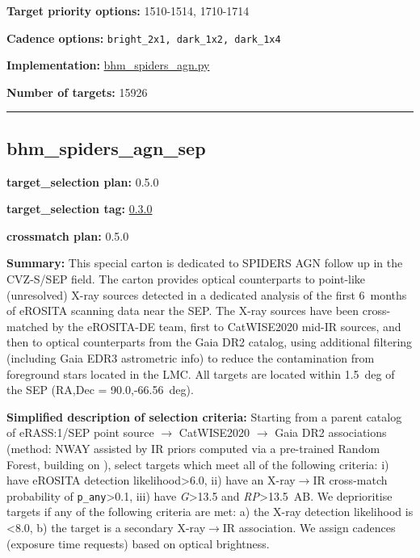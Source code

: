 \noindent\textbf{Target priority options:} 1510-1514, 1710-1714

\noindent\textbf{Cadence options:} \texttt{bright\_2x1,\ dark\_1x2,\ dark\_1x4}

\noindent\textbf{Implementation:}
\href{https://github.com/sdss/target_selection/blob/0.3.0/python/target_selection/cartons/bhm_spiders_agn.py}{bhm\_spiders\_agn.py}

\noindent\textbf{Number of targets:} 15926

\begin{center}\rule{0.5\linewidth}{0.5pt}\end{center}

\hypertarget{bhm_spiders_agn_sep_plan0.5.0}{%
\subsection{bhm\_spiders\_agn\_sep}\label{bhm_spiders_agn_sep_plan0.5.0}}

\noindent\textbf{target\_selection plan:} 0.5.0

\noindent\textbf{target\_selection tag:}
\href{https://github.com/sdss/target_selection/tree/0.3.0/}{0.3.0}

\noindent\textbf{crossmatch plan:} 0.5.0

\noindent\textbf{Summary:} This special carton is dedicated to SPIDERS AGN follow
up in the CVZ-S/SEP field. The carton provides optical counterparts to
point-like (unresolved) X-ray sources detected in a dedicated analysis
of the first 6~months of eROSITA scanning data near the SEP. The X-ray
sources have been cross-matched by the eROSITA-DE team, first to
CatWISE2020 \citep{Marocco2021}
mid-IR sources, and then to optical counterparts from the Gaia DR2
catalog, using additional filtering (including Gaia EDR3 astrometric
info) to reduce the contamination from foreground stars located in the
LMC. All targets are located within 1.5~deg of the SEP (RA,Dec =
90.0,-66.56~deg).

\noindent\textbf{Simplified description of selection criteria:} Starting from a
parent catalog of eRASS:1/SEP point source $\rightarrow$ CatWISE2020 $\rightarrow$ Gaia DR2
associations (method: NWAY assisted by IR priors computed via a
pre-trained Random Forest, building on
\citealt{Salvato2022}), select targets which meet all of the following criteria:
i) have eROSITA detection likelihood\textgreater6.0, ii) have an
X-ray$\rightarrow$IR cross-match probability of \texttt{p\_any}\textgreater0.1, iii)
have \emph{G}\textgreater13.5 and \emph{RP}\textgreater13.5~AB. We
deprioritise targets if any of the following criteria are met: a) the
X-ray detection likelihood is \textless8.0, b) the target is a secondary
X-ray$\rightarrow$IR association. We assign cadences (exposure time requests) based
on optical brightness.


